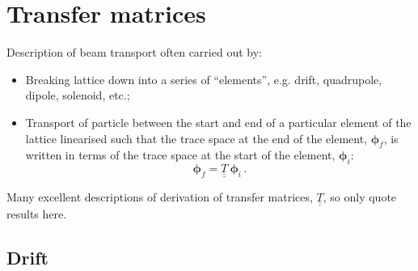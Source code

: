 \graphicspath{ {04-TransferMatrices/Figures/} }

\section{Transfer matrices}

Description of beam transport often carried out by:
\begin{itemize}
  \item Breaking lattice down into a series of ``elements'',
    e.g. drift, quadrupole, dipole, solenoid, etc.;
  \item Transport of particle between the start and end of a
    particular element of the lattice linearised such that the trace
    space at the end of the element, $\bm{\phi}_f$, is written in
    terms of the trace space at the start of the element,
    $\bm{\phi}_i$:
    \begin{equation}
      \bm{\phi}_f = \underline{\underline{T}} ~ \bm{\phi}_i \,.
    \end{equation}
\end{itemize}
Many excellent descriptions of derivation of transfer matrices,
$\underline{\underline{T}}$, so only quote results here.

\subsection{Drift}


